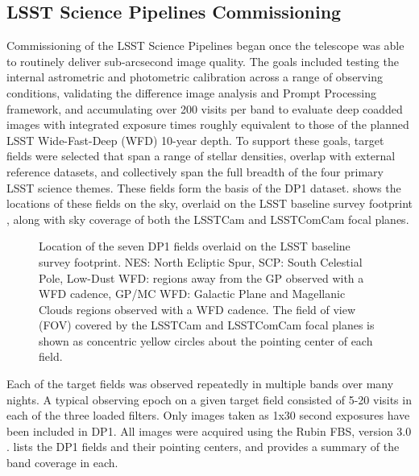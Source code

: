 \subsection{LSST Science Pipelines Commissioning
\label{ssec:pipelines_commissioning}}
Commissioning of the LSST Science Pipelines \citep{PSTN-019} began once the telescope was able to routinely deliver sub-arcsecond image quality.
The goals included testing the internal astrometric and photometric calibration across a range of observing conditions, validating the difference image analysis and Prompt Processing \citep{dmtn-219} framework, and accumulating over 200 visits per band to evaluate deep coadded images with integrated exposure times roughly equivalent to those of the planned LSST Wide-Fast-Deep (WFD) 10-year depth. 
To support these goals, \nfields target fields were selected that span a range of stellar densities, overlap with external reference datasets, and collectively span the full breadth of the four primary LSST science themes.
These \nfields fields form the basis of the DP1 dataset.
 shows the locations of these \nfields fields on the sky, overlaid on the LSST baseline survey footprint \citep{PSTN-051, PSTN-052, PSTN-053, PSTN-055, PSTN-056}, along with sky coverage of both the LSSTCam and LSSTComCam focal planes. 
\begin{figure*}[bt!]
\centering
{}
\caption{Location of the seven DP1 fields overlaid on the LSST baseline survey footprint. NES: North Ecliptic Spur, SCP: South Celestial Pole, Low-Dust WFD: regions away from the GP observed with a WFD cadence, GP/MC WFD: Galactic Plane and Magellanic Clouds regions observed with a WFD cadence. The field of view (FOV) covered by the LSSTCam and LSSTComCam focal planes is shown as concentric yellow circles about the pointing center of each field.}
\label{fig:dp1_fields_on_sky}
\end{figure*}

Each of the \nfields target fields was observed repeatedly in multiple bands over many nights.
A typical observing epoch on a given target field consisted of 5-20 visits in each of the three loaded filters. 
Only images taken as 1x30 second exposures have been included in DP1. 
All images were acquired using the Rubin \gls{FBS}, version 3.0 \citep{Naghib_2019, peter_yoachim_2024_13985198}.
 lists the \nfields DP1 fields and their pointing centers, and provides a summary of the band coverage in each.


